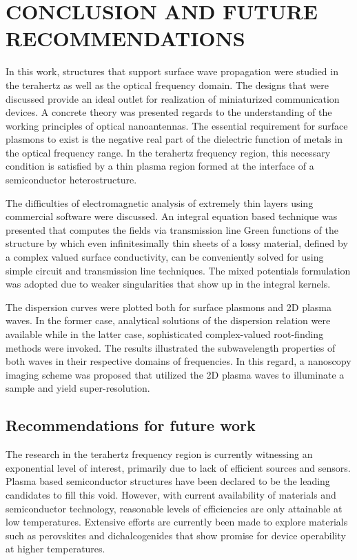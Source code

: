 \chapter{\uppercase {Conclusion and Future recommendations}}

In this work, structures that support surface wave propagation were studied in the terahertz as well as the  optical frequency domain. The designs that were discussed provide an ideal outlet for realization of miniaturized communication devices. A concrete theory was presented regards to the understanding of the working principles of optical nanoantennas. The essential requirement for surface plasmons to exist is the negative real part of the dielectric function of metals in the optical frequency range. In the terahertz frequency region, this necessary condition is satisfied by a thin plasma region formed at the interface of a semiconductor heterostructure.

The difficulties of electromagnetic analysis of extremely thin layers using commercial software were discussed. An integral equation based technique was presented that computes the fields via transmission line Green functions of the structure by which even infinitesimally thin sheets of a lossy material, defined by a complex valued surface conductivity, can be conveniently solved for using simple circuit and transmission line techniques. The mixed potentials formulation was adopted due to weaker singularities that show up in the integral kernels.

The dispersion curves were plotted both for surface plasmons and 2D plasma waves. In the former case, analytical solutions of the dispersion relation were available while in the latter case, sophisticated complex-valued root-finding methods were invoked. The results illustrated the subwavelength properties of both waves in their respective domains of frequencies. In this regard, a nanoscopy imaging scheme was proposed that utilized the 2D plasma waves to illuminate a sample and yield super-resolution.

\section*{Recommendations for future work}
%
%
The research in the terahertz frequency region is currently witnessing an exponential level of interest, primarily due to lack of efficient sources and sensors. Plasma based semiconductor structures have been declared to be the leading candidates to fill this void. However, with current availability of materials and semiconductor technology, reasonable levels of efficiencies are only attainable at low temperatures. Extensive efforts are currently been made to explore materials such as perovskites and dichalcogenides that show promise for device operability at higher temperatures.

